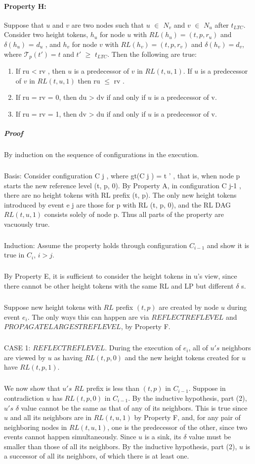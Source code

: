 \paragraph{Property H:} Suppose that $u$ and $v$ are two nodes such that $u$ $\in$ $N_v$ and $v$ $\in$ $N_u$ after $t_{LTC}$. Consider two height tokens, $h_u$ for node $u$ with $RL(h_u ) = (t, p, r_u )$ and $\delta (h_u )$ = $d_u$ , and $h_v$ for node $v$ with $RL(h_v ) = (t, p, r_v )$ and $\delta (h_v ) = d_v$, where $\mathcal{T}_p(t') = t$ and $t '$ $\geq$ $t_{LTC}$. Then the following are true: 
\begin{enumerate}
	\item If ru < rv , then $u$ is a predecessor of $v$ in $RL (t, u, 1)$. If $u$ is a predecessor of $v$ in $RL (t, u, 1)$ then ru $\leq$ rv .
	\item If ru = rv = 0, then du > dv if and only if $u$ is a predecessor of v.
	\item If ru = rv = 1, then dv > du if and only if $u$ is a predecessor of v.
\end{enumerate}
\subparagraph{Proof} By induction on the sequence of configurations in the execution. 
\subparagraph{}Basis: Consider configuration C j , where gt(C j ) = t ' , that is, when node p starts the new reference level (t, p, 0). By Property A, in configuration C j-1 , there are no height tokens with RL prefix (t, p). The only new height tokens introduced by event e j are those for p with RL (t, p, 0), and the RL DAG $RL (t, u, 1)$ consists solely of node p. Thus all parts of the property are vacuously true.
\subparagraph{}Induction: Assume the property holds through configuration $C_{i-1}$ and show it is true in $C_i$, $i > j$.
\subparagraph{}By Property E, it is sufficient to consider the height tokens in u's view, since there cannot be other height tokens with the same RL and LP but different $\delta$ s.
\subparagraph{}Suppose new height tokens with $RL$ prefix $(t, p)$ are created by node $u$ during event $e_i$. The only ways this can happen are via $REFLECTREFLEVEL$ and $PROPAGATELARGESTREFLEVEL$, by Property F.
\subparagraph{}CASE 1: $REFLECTREFLEVEL$. During the execution of $e_i$, all of $u's$ neighbors are viewed by $u$ as having $RL (t, p, 0)$ and the new height tokens created for $u$ have $RL (t, p, 1)$.
\subparagraph{}We now show that $u's$ $RL$ prefix is less than $(t, p)$ in $C_{i-1}$. Suppose in contradiction $u$ has $RL (t, p, 0)$ in $C_{i-1}$. By the inductive hypothesis, part (2), $u's$ $\delta$ value cannot be the same as that of any of its neighbors. This is true since $u$ and all its neighbors are in $RL (t, u, 1)$ by Property F, and, for any pair of neighboring nodes in $RL (t, u, 1)$, one is the predecessor of the other, since two events cannot happen simultaneously. Since $u$ is a sink, its $\delta$ value must be smaller than those of all its neighbors. By the inductive hypothesis, part (2), $u$ is a successor of all its neighbors, of which there is at least one.
